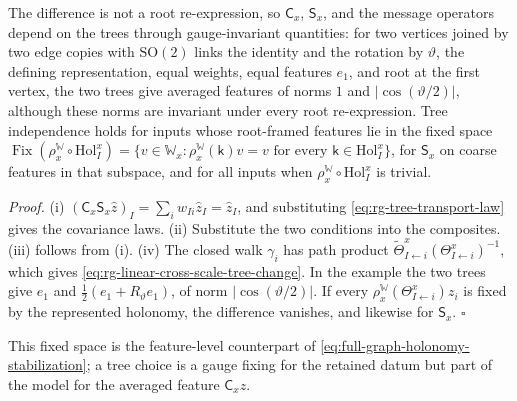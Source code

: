 The difference is not a root re-expression, so $\mathsf C_x$, $\mathsf S_x$, and the message operators
depend on the trees through gauge-invariant quantities: for two vertices joined by two edge copies with
$\mathrm{SO}(2)$ links the identity and the rotation by $\vartheta$, the defining representation, equal
weights, equal features $e_1$, and root at the first vertex, the two trees give averaged features of norms
$1$ and $\lvert\cos(\vartheta/2)\rvert$, although these norms are invariant under every root
re-expression. Tree independence holds for inputs whose root-framed features lie in the fixed space
$\operatorname{Fix}(\rho^{\mathbb W}_x\circ\mathrm{Hol}^x_I)=\{v\in \mathbb W_x:\rho^{\mathbb W}_x(\mathsf k)v=v\text{ for every }\mathsf k\in\mathrm{Hol}^x_I\}$,
for $\mathsf S_x$ on coarse features in that subspace, and for all inputs when
$\rho^{\mathbb W}_x\circ\mathrm{Hol}^x_I$ is trivial. 

\noindent\emph{Proof.}
(i) $(\mathsf C_x\mathsf S_x\hat z)_I=\sum_iw_{Ii}\hat z_I=\hat z_I$, and substituting
\eqref{eq:rg-tree-transport-law} gives the covariance laws. (ii) Substitute the two conditions into the
composites. (iii) follows from (i). (iv) The closed walk $\gamma_i$ has path product
$\widetilde\Theta^x_{I\leftarrow i}(\Theta^x_{I\leftarrow i})^{-1}$, which gives
\eqref{eq:rg-linear-cross-scale-tree-change}. In the example the two trees give $e_1$ and
$\tfrac12(e_1+R_\vartheta e_1)$, of norm $\lvert\cos(\vartheta/2)\rvert$. If every
$\rho^{\mathbb W}_x(\Theta^x_{I\leftarrow i})z_i$ is fixed by the represented holonomy, the difference vanishes, and
likewise for $\mathsf S_x$. $\square$

This fixed space is the feature-level counterpart of \eqref{eq:full-graph-holonomy-stabilization}; a tree
choice is a gauge fixing for the retained datum but part of the model for the averaged feature
$\mathsf C_xz$.

